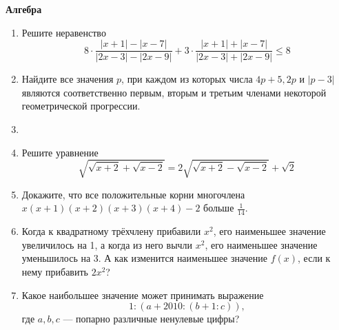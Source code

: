 


  \clearpage
  \pagestyle{empty}
  {\Large\bf Алгебра}
  \begin{enumerate}
    \item Решите неравенство \[8\cdot\frac{|x+1|-|x-7|}{|2x-3|-|2x-9|}+3\cdot\frac{|x+1|+|x-7|}{|2x-3|+|2x-9|}\le8\]
    \item Найдите все значения $p$, при каждом из которых
    числа $4p+5, 2p$ и $|p-3|$ являются соответственно
    первым, вторым и третьим членами некоторой геометрической прогрессии.
    \item \phantom{sdaasdsadsad}   
    \item Решите уравнение \[\sqrt{\sqrt{x+2}+\sqrt{x-2}}=2\sqrt{\sqrt{x+2}-\sqrt{x-2}}+\sqrt{2}\]
    \item Докажите, что все положительные корни многочлена $x(x+1)(x+2)(x+3)(x+4)-2$ больше $\frac{1}{14}$.
    \item Когда к квадратному трёхчлену прибавили $x^2$, его наименьшее значение
    увеличилось на 1, а когда из него вычли $x^2$, его наименьшее значение уменьшилось на 3.
    А как изменится наименьшее значение $f(x)$, если к нему прибавить $2x^2$?
    \item Какое наибольшее значение может принимать выражение \[1:(a+2010:(b+1:c)),\]
    где $a,b,c$ --- попарно различные ненулевые цифры?
  \end{enumerate}

